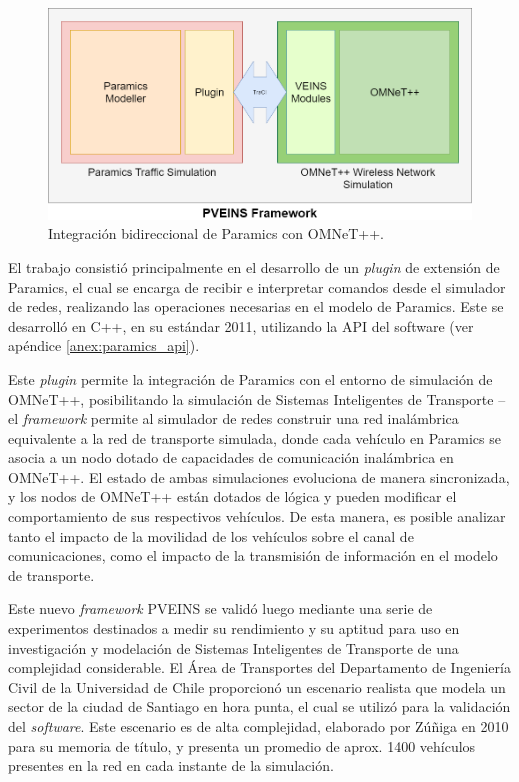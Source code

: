 \begin{figure}[tpb]
    \centering
    \includegraphics[width=\linewidth]{figuras/PVEINSArch.png}
    \caption{Integración bidireccional de Paramics con OMNeT++.}
    \label{fig:pveins_genarch:resumen}
\end{figure}

El trabajo consistió principalmente en el desarrollo de un \emph{plugin} de extensión de Paramics, el cual se encarga de recibir e interpretar comandos desde el simulador de redes, realizando las operaciones necesarias en el modelo de Paramics. Este se desarrolló en C++, en su estándar 2011, utilizando la API del software (ver apéndice \ref{anex:paramics_api}).

Este \emph{plugin} permite la integración de Paramics con el entorno de simulación de OMNeT++, posibilitando la simulación de Sistemas Inteligentes de Transporte -- el \emph{framework} permite al simulador de redes construir una red inalámbrica equivalente a la red de transporte simulada, donde cada vehículo en Paramics se asocia a un nodo dotado de capacidades de comunicación inalámbrica en OMNeT++. El estado de ambas simulaciones evoluciona de manera sincronizada, y los nodos de OMNeT++ están dotados de lógica y pueden modificar el comportamiento de sus respectivos vehículos. De esta manera, es posible analizar tanto el impacto de la movilidad de los vehículos sobre el canal de comunicaciones, como el impacto de la transmisión de información en el modelo de transporte.

Este nuevo \emph{framework} PVEINS se validó luego mediante una serie de experimentos destinados a medir su rendimiento y su aptitud para uso en investigación y modelación de Sistemas Inteligentes de Transporte de una complejidad considerable. El Área de Transportes del Departamento de Ingeniería Civil de la Universidad de Chile proporcionó un escenario realista que modela un sector de la ciudad de Santiago en hora punta, el cual se utilizó para la validación del \emph{software}. Este escenario es de alta complejidad, elaborado por Zúñiga \autocite{zuniga} en 2010 para su memoria de título, y presenta un promedio de aprox. 1400 vehículos presentes en la red en cada instante de la simulación. 

